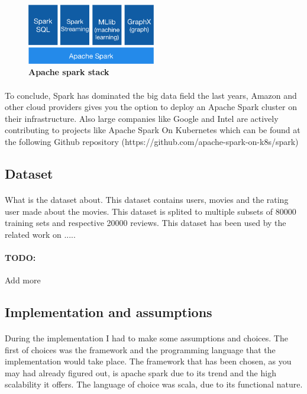 \begin{figure}[ht]
  \centering
    \includegraphics[width=0.5\textwidth]{images/spark-stack.png}
    \caption{\bfseries Apache spark stack \cite{ApacheSpark:1}}
   \label{apacheSparkStack}
\end{figure}

\paragraph{} To conclude, Spark has dominated the big data field the last years, Amazon and other cloud providers gives you the option to deploy an Apache Spark cluster on their infrastructure. Also large companies like Google and Intel are actively contributing to projects like Apache Spark On Kubernetes which can be found at the following Github repository (https://github.com/apache-spark-on-k8s/spark)

\subsection{Dataset}
\paragraph{}What is the dataset about. This dataset contains users, movies and the rating user made about the movies.
This dataset is splited to multiple subsets of 80000 training sets and respective 20000 reviews.
This dataset has been used by the related work on .....
\cite{MovieLens:3}
\paragraph{TODO:} Add more

\subsection{Implementation and assumptions}
\paragraph{}During the implementation I had to make some assumptions and choices. The first of choices was the framework and the programming language that the implementation would take place. The framework that has been chosen, as you may had already figured out, is apache spark due to its trend and the high scalability it offers. The language of choice was scala, due to its functional nature.
